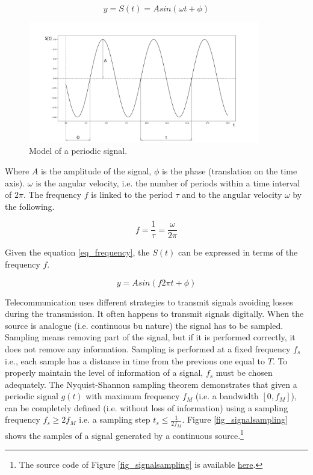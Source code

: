 \begin{equation}
y=S(t)=Asin(\omega t+\phi)
\label{eq_signal}
\end{equation}


\begin{figure}[hbt!]
\centering
\includegraphics[width=0.9\textwidth]{SectionLetsMath/elemStat_figures/fig_signal.png}
\captionsetup{type=figure}
\caption{Model of a periodic signal.}
\label{fig_signal}
\end{figure}

Where $A$ is the amplitude of the signal, $\phi$ is the phase (translation on the time axis). $\omega$ is the angular velocity, i.e. the number of periods within a time interval of $2\pi$. The frequency $f$ is linked to the period $\tau$ and to the angular velocity $\omega$ by the following.

\begin{equation}
f=\frac{1}{\tau}=\frac{\omega}{2\pi}
\label{eq_frequency}
\end{equation}

Given the equation \ref{eq_frequency}, the $S\left(t\right)$ can be expressed in terms of the frequency $f$.

\begin{equation}
y=Asin(f2\pi t+\phi)
\label{eq_frequency2}
\end{equation}

Telecommunication uses different strategies to transmit signals avoiding losses during the transmission. It often happens to transmit signals digitally. When the source is analogue (i.e. continuous bu nature) the signal has to be sampled. Sampling means removing part of the signal, but if it is performed correctly, it does not remove any information. Sampling is performed at a fixed frequency $f_s$ i.e., each sample has a distance in time from the previous one equal to $T$. To properly maintain the level of information of a signal, $f_s$ must be chosen adequately. The Nyquist-Shannon sampling theorem demonstrates that given a periodic signal $g\left(t\right)$ with maximum frequency $f_M$ (i.e. a bandwidth $[0,f_M]$), can be completely defined (i.e. without loss of information) using a sampling frequency $f_s\geq2f_M$ i.e. a sampling step $t_s\le\frac{1}{2f_M}$. Figure \ref{fig_signalsampling} shows the samples of a signal generated by a continuous source.\footnote{The source code of Figure \ref{fig_signalsampling} is available \href{https://github.com/aletuf93/logproj/blob/master/examples/03.\%20Statistics.ipynb}{here}.}


